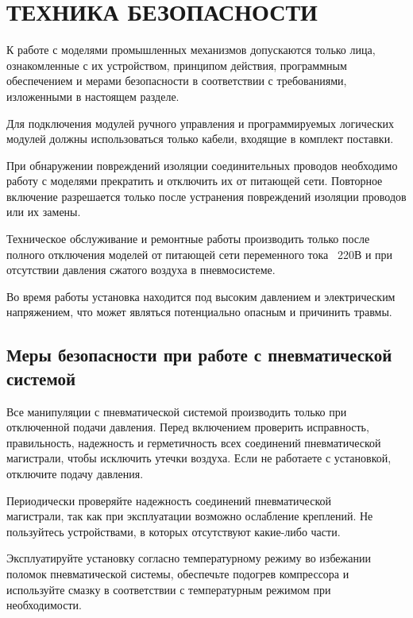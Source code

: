 \chapter{ТЕХНИКА БЕЗОПАСНОСТИ}
К работе с моделями промышленных механизмов допускаются только лица, ознакомленные с их устройством, принципом действия, программным обеспечением и мерами безопасности в соответствии с требованиями, изложенными в настоящем разделе.

Для подключения модулей ручного управления и программируемых логических модулей должны использоваться только кабели, входящие в комплект поставки.

При обнаружении повреждений изоляции соединительных проводов необходимо работу с моделями прекратить и отключить их от питающей сети. Повторное включение разрешается только после устранения повреждений изоляции проводов или их замены.

Техническое обслуживание и ремонтные работы производить только после полного отключения моделей от питающей сети переменного тока ~220В и при отсутствии давления сжатого воздуха в пневмосистеме.


Во время работы установка находится под высоким давлением и электрическим напряжением, что может являться потенциально опасным и причинить травмы.

\section{Меры безопасности при работе с пневматической системой}
Все манипуляции с пневматической системой производить только при отключенной подачи давления. Перед включением проверить исправность, правильность, надежность и герметичность всех соединений пневматической магистрали, чтобы исключить утечки воздуха. Если не работаете с установкой, отключите подачу давления.


Периодически проверяйте надежность соединений пневматической\\магистрали, так как при эксплуатации возможно ослабление креплений. Не пользуйтесь устройствами, в которых отсутствуют какие-либо части.

Эксплуатируйте установку согласно температурному режиму во избежании поломок пневматической системы, обеспечьте подогрев компрессора и используйте смазку в соответствии с температурным режимом при необходимости.

